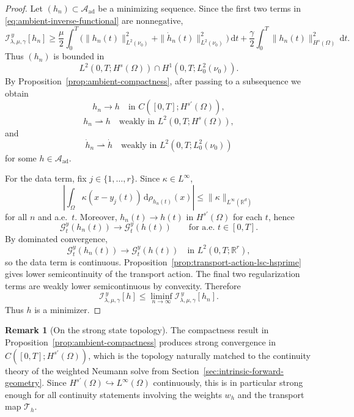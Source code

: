\documentclass{article}
\theoremstyle{definition}
\newtheorem{remark}[theorem]{Remark}
\renewcommand{\d}{\mathrm{d}}
\begin{document}
\begin{proof}
    Let \((h_n)\subset \mathcal A_{\mathrm{ad}}\) be a minimizing sequence. Since the first two terms
    in \eqref{eq:ambient-inverse-functional} are nonnegative,
    \[
        \mathcal I_{\lambda,\mu,\gamma}^{\,y}[h_n]
        \ge
        \frac{\mu}{2}\int_0^T
        \Big(
        \|h_n(t)\|_{L^2(\nu_0)}^2+\|\dot h_n(t)\|_{L^2(\nu_0)}^2
        \Big)\,\d t
        +
        \frac{\gamma}{2}\int_0^T \|h_n(t)\|_{H^s(\Omega)}^2\,\d t.
    \]
    Thus \((h_n)\) is bounded in
    \[
        L^2(0,T;H^s(\Omega))\cap H^1(0,T;L^2_0(\nu_0)).
    \]
    By Proposition~\ref{prop:ambient-compactness}, after passing to a subsequence we obtain
    \[
        h_n\to h
        \quad\text{in } C([0,T];H^{s'}(\Omega)),
    \]
    \[
        h_n\rightharpoonup h
        \quad\text{weakly in } L^2(0,T;H^s(\Omega)),
    \]
    and
    \[
        \dot h_n\rightharpoonup \dot h
        \quad\text{weakly in } L^2(0,T;L^2_0(\nu_0))
    \]
    for some \(h\in \mathcal A_{\mathrm{ad}}\).

    For the data term, fix \(j\in\{1,\dots,r\}\). Since \(\kappa\in L^\infty\),
    \[
        \left|
        \int_\Omega \kappa(x-y_j(t))\,\d\rho_{h_n(t)}(x)
        \right|
        \le
        \|\kappa\|_{L^\infty(\mathbb R^d)}
    \]
    for all \(n\) and a.e.\ \(t\). Moreover, \(h_n(t)\to h(t)\) in \(H^{s'}(\Omega)\) for each \(t\),
    hence
    \[
        \mathcal G_t^y(h_n(t))\to \mathcal G_t^y(h(t))
        \qquad\text{for a.e.\ }t\in[0,T].
    \]
    By dominated convergence,
    \[
        \mathcal G_t^y(h_n(t))\to \mathcal G_t^y(h(t))
        \quad\text{in } L^2(0,T;\mathbb R^r),
    \]
    so the data term is continuous. Proposition~\ref{prop:transport-action-lsc-hsprime} gives lower
    semicontinuity of the transport action. The final two regularization terms are weakly lower
    semicontinuous by convexity. Therefore
    \[
        \mathcal I_{\lambda,\mu,\gamma}^{\,y}[h]
        \le
        \liminf_{n\to\infty} \mathcal I_{\lambda,\mu,\gamma}^{\,y}[h_n].
    \]
    Thus \(h\) is a minimizer.
\end{proof}

\begin{remark}[On the strong state topology]
    \label{rem:strong-compactness}
    The compactness result in Proposition~\ref{prop:ambient-compactness} produces strong convergence in
    \(C([0,T];H^{s'}(\Omega))\), which is the topology naturally matched to the continuity theory of
    the weighted Neumann solve from Section~\ref{sec:intrinsic-forward-geometry}. Since
    \(H^{s'}(\Omega)\hookrightarrow L^\infty(\Omega)\) continuously, this is in particular strong
    enough for all continuity statements involving the weights \(w_h\) and the transport map
    \(\mathcal T_h\).
\end{remark}
\end{document}
